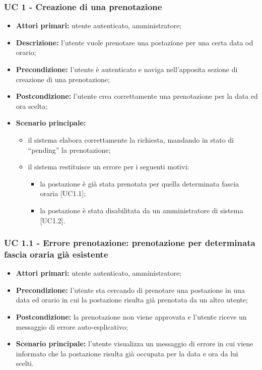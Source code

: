 \subsubsection{UC 1 - Creazione di una prenotazione}

\begin{itemize}
\item \textbf{Attori primari:} utente autenticato, amministratore;
\item \textbf{Descrizione:} l’utente vuole prenotare una postazione per una certa data od orario;
\item \textbf{Precondizione:} l’utente è autenticato e naviga nell’apposita sezione di creazione di una prenotazione;
\item \textbf{Postcondizione:} l’utente crea correttamente una prenotazione per la data ed ora scelta;
\item \textbf{Scenario principale:} 
	\begin{itemize}
		\item il sistema elabora correttamente la richiesta, mandando in stato di “pending” la prenotazione;
		\item il sistema restituisce un errore per i seguenti motivi:
		\begin{itemize}
			\item la postazione è già stata prenotata per quella determinata fascia oraria [UC1.1];
			\item la postazione è stata disabilitata da un amministratore di sistema [UC1.2].	
		\end{itemize}
	\end{itemize}
\end{itemize}

\subsubsection{UC 1.1 - Errore prenotazione: prenotazione per determinata fascia oraria già esistente}
\begin{itemize}
\item \textbf{Attori primari:} utente autenticato, amministratore;
\item \textbf{Precondizione:} l'utente sta cercando di prenotare una postazione in una data ed orario in cui la postazione risulta già prenotata da un altro utente;
\item \textbf{Postcondizione:} la prenotazione non viene approvata e l'utente riceve un messaggio di errore auto-esplicativo;
\item \textbf{Scenario principale:} l'utente visualizza un messaggio di errore in cui viene informato che la postazione risulta già occupata per la data e ora da lui scelti.
\end{itemize}

